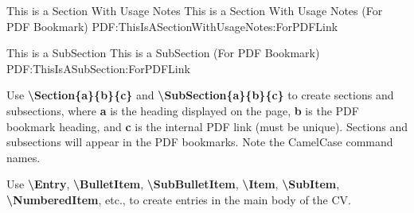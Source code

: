 \documentclass[letterpaper,MMMMyyyy,nonstopmode]{simpleresumecv}
\newcommand{\Code}[1]{\mbox{\textbf{#1}}}
\newcommand{\CodeCommand}[1]{\mbox{\textbf{\textbackslash{#1}}}}
\begin{document}
\begin{Body}

\iffalse
\Section
{Publications}
{Publications}
{PDF:Publications}

\SubSection
{Technical Editor}
{Technical Editor}
{PDF:TechnicalEditor}

\Entry
\href{https://www.amazon.com/Oracle-Certified-Associate-ProgrammerStudy/dp/1849687323}
{Reece, Richard M. \textit{Oracle Certified Associate, Java SE 7 Programmer Study Guide}, Packt Publishing, 2012}

\Gap
\Entry
\href
{https://www.amazon.com/Java-Concurrency-Cookbook-FernandezJavier/dp/1849687889}
{Gonzalez, Javier Fernandez. \textit{Java 7 Concurrency Cookbook}, Packt Publishing, 2012}
\fi




\iffalse
\newpage
\begingroup
\color{red}

\Section
{This is a\newline
Section\newline
With\newline
Usage Notes}
{This is a Section With Usage Notes (For PDF Bookmark)}
{PDF:ThisIsASectionWithUsageNotes:ForPDFLink}

\SubSection
{This is a SubSection}
{This is a SubSection (For PDF Bookmark)}
{PDF:ThisIsASubSection:ForPDFLink}

\Gap
\BulletItem
Use \CodeCommand{Section\{a\}\{b\}\{c\}} and
\CodeCommand{SubSection\{a\}\{b\}\{c\}}
to create sections and subsections, where
\Code{a} is the heading displayed on the page,
\Code{b} is the PDF bookmark heading, and
\Code{c} is the internal PDF link (must be unique).
Sections and subsections will appear in the PDF bookmarks.
Note the CamelCase command names.

\Gap
\BulletItem
Use
\CodeCommand{Entry},
\CodeCommand{BulletItem},
\CodeCommand{SubBulletItem},
\CodeCommand{Item},
\CodeCommand{SubItem},
\CodeCommand{NumberedItem},
etc.,
to create entries in the main body of the CV.


\end{Body}
\end{document}

